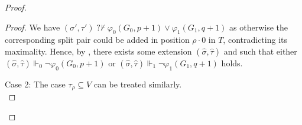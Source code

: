 \documentclass{article}
\numberwithin{theorem}{section}
\newtheorem{lemma}[theorem]{Lemma}
\newcommand{\quentin}[1]{\textcolor{green}{#1}}
\newcommand{\nqvdash}{\operatorname{{?}{\nvdash}}}
\newcommand{\BSig}{\mathsf{B}\Sigma^0}
\newcommand{\M}{\mathcal{M}}
\begin{document}
\begin{proof}
\begin{proof}
We have $(\sigma', \tau') \nqvdash \varphi_0(G_0,p + 1) \vee \varphi_1(G_1,q + 1)$ as otherwise the corresponding split pair could be added in position $\rho \cdot 0$ in $T$, contradicting its maximality. Hence, by , there exists some extension $(\hat \sigma, \hat \tau)$ and such that either $(\hat \sigma, \hat \tau) \Vdash_0 \neg \varphi_0(G_0,p + 1)$ or $(\hat \sigma, \hat \tau) \Vdash_1 \neg \varphi_1(G_1,q+1)$ holds.


Case 2: The case $\tau_{\rho} \subseteq V$ can be treated similarly. \\
\end{proof}






\end{proof}
\end{document}
